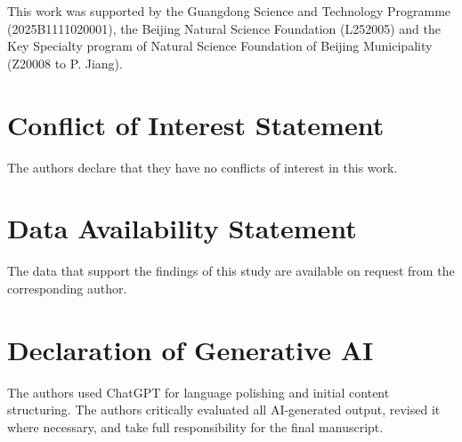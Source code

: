 \documentclass[12pt,twoside,letterpaper]{article}
\begin{document}
This work was supported by the Guangdong Science and Technology Programme (2025B1111020001), the Beijing Natural Science Foundation (L252005) and the Key Specialty program of Natural Science Foundation of Beijing Municipality (Z20008 to P. Jiang).

\section*{Conflict of Interest Statement}

The authors declare that they have no conflicts of interest in this work.

\section*{Data Availability Statement}

The data that support the findings of this study are available on request from the corresponding author.

\section*{Declaration of Generative AI}

The authors used ChatGPT for language polishing and initial content structuring. The authors critically evaluated all AI-generated output, revised it where necessary, and take full responsibility for the final manuscript.

\begingroup

\end{document}
